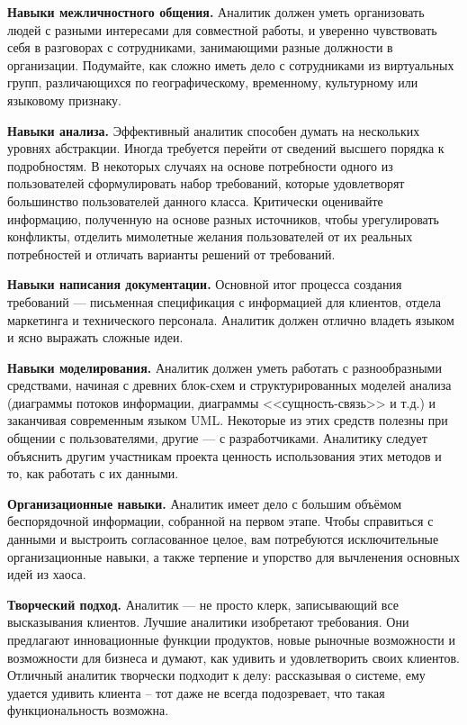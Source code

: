 \documentclass{../../text-style}
\begin{document}
\textbf{Навыки межличностного общения.} Аналитик должен уметь организовать людей с разными интересами для совместной работы, и уверенно чувствовать себя в разговорах с сотрудниками, занимающими разные должности в организации. Подумайте, как сложно иметь дело с сотрудниками из виртуальных групп, различающихся по географическому, временному, культурному или языковому признаку.

\textbf{Навыки анализа.} Эффективный аналитик способен думать на нескольких уровнях абстракции. Иногда требуется перейти от сведений высшего порядка к подробностям. В некоторых случаях на основе потребности одного из пользователей сформулировать набор требований, которые удовлетворят большинство пользователей данного класса. Критически оценивайте информацию, полученную на основе разных источников, чтобы урегулировать конфликты, отделить мимолетные желания пользователей от их реальных потребностей и отличать варианты решений от требований.

\textbf{Навыки написания документации.} Основной итог процесса создания требований --- письменная спецификация с информацией для клиентов, отдела маркетинга и технического персонала. Аналитик должен отлично владеть языком и ясно выражать сложные идеи.

\textbf{Навыки моделирования.} Аналитик должен уметь работать с разнообразными средствами, начиная с древних блок-схем и структурированных моделей анализа (диаграммы потоков информации, диаграммы <<сущность-связь>> и т.д.) и заканчивая современным языком UML. Некоторые из этих средств полезны при общении с пользователями, другие --- с разработчиками. Аналитику следует объяснить другим участникам проекта ценность использования этих методов и то, как работать с их данными.

\textbf{Организационные навыки.} Аналитик имеет дело с большим объёмом беспорядочной информации, собранной на первом этапе. Чтобы справиться с данными и выстроить согласованное целое, вам потребуются исключительные организационные навыки, а также терпение и упорство для вычленения основных идей из хаоса.

\textbf{Творческий подход.} Аналитик --- не просто клерк, записывающий все высказывания клиентов. Лучшие аналитики изобретают требования. Они предлагают инновационные функции продуктов, новые рыночные возможности и возможности для бизнеса и думают, как удивить и удовлетворить своих клиентов. Отличный аналитик творчески подходит к делу: рассказывая о системе, ему удается удивить клиента -- тот даже не всегда подозревает, что такая функциональность возможна.
\end{document}

